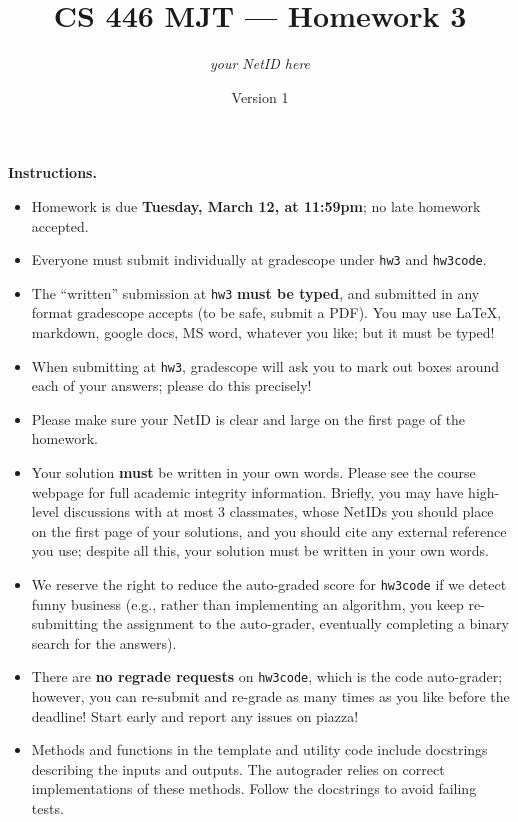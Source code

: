 \documentclass{article}
\title{CS 446 MJT --- Homework 3}
\author{\emph{your NetID here}}
\date{Version 1}
\theoremstyle{definition}
\theoremstyle{remark}
\begin{document}
\maketitle

\textbf{Instructions.}
\begin{itemize}
    \item
    Homework is due \textbf{Tuesday, March 12, at 11:59pm}; no late homework accepted.

    \item
    Everyone must submit individually at gradescope under \texttt{hw3} and \texttt{hw3code}.

    \item
    The ``written'' submission at \texttt{hw3} \textbf{must be typed}, and submitted in
    any format gradescope accepts (to be safe, submit a PDF).  You may use \LaTeX, markdown,
    google docs, MS word, whatever you like; but it must be typed!

    \item
    When submitting at \texttt{hw3}, gradescope will ask you to mark out boxes
    around each of your answers; please do this precisely!

    \item
    Please make sure your NetID is clear and large on the first page of the homework.

    \item
    Your solution \textbf{must} be written in your own words.
    Please see the course webpage for full academic integrity information.
    Briefly, you may have high-level discussions with at most 3 classmates,
    whose NetIDs you should place on the first page of your solutions,
    and you should cite any external reference you use; despite all this,
    your solution must be written in your own words.

    \item
    We reserve the right to reduce the auto-graded score for \texttt{hw3code}
    if we detect funny business (e.g., rather than implementing an algorithm,
    you keep re-submitting the assignment to the auto-grader, eventually completing
    a binary search for the answers).

    \item
    There are \textbf{no regrade requests} on \texttt{hw3code}, which is the code auto-grader;
    however, you can re-submit and re-grade as many times as you like before the deadline!
    Start early and report any issues on piazza!

    \item
    Methods and functions in the template and utility code include
    docstrings describing the inputs and outputs.  The autograder
    relies on correct implementations of these methods.  Follow the
    docstrings to avoid failing tests.

\end{itemize}
\end{document}
